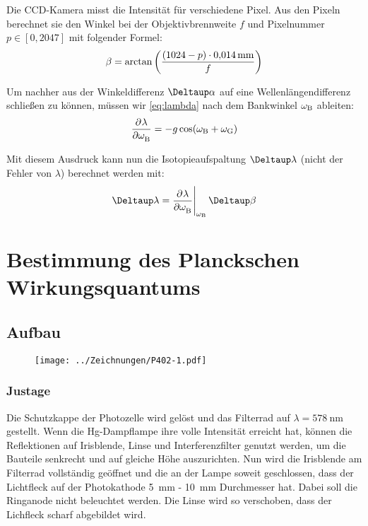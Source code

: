 Die CCD-Kamera misst die Intensität für verschiedene Pixel. Aus den Pixeln
berechnet sie den Winkel bei der Objektivbrennweite $f$ und Pixelnummer $p \in
[0, 2047]$ mit folgender Formel:
\[
    \beta = \arctan\del{\frac{(1024 - p) \cdot \SI{0.014}{\milli\meter}}f}
\]

Um nachher aus der Winkeldifferenz $\Deltaup \alpha$ auf eine
Wellenlängendifferenz schließen zu können, müssen wir \eqref{eq:lambda} nach
dem Bankwinkel $\omega_\text B$ ableiten:
\begin{equation}
    \label{eq:d_Lambda_d_beta}
    \dpd\lambda\omegaB = - g \cos(\omegaB + \omegaG)
\end{equation}

Mit diesem Ausdruck kann nun die Isotopieaufspaltung $\Deltaup \lambda$ (nicht
der Fehler von $\lambda$) berechnet werden mit:
\begin{equation}
    \label{eq:Delta_lambda}
    \Deltaup\lambda = \eval{\dpd\lambda\omegaB}_{\omegaB} \Deltaup\beta
\end{equation}


\FloatBarrier
\section{Bestimmung des Planckschen Wirkungsquantums}

\FloatBarrier
\subsection{Aufbau}

\begin{figure}[htbp]
    \centering
    \texttt{[image: ../Zeichnungen/P402-1.pdf]}
    \caption{%
        \parencite[Abbildung~P402.1]{physik412-Anleitung}
    }
    \label{fig:P402.1}
\end{figure}

\FloatBarrier
\subsubsection{Justage}

Die Schutzkappe der Photozelle wird gelöst und das Filterrad auf $\lambda =
\SI{578}{\nano\meter}$ gestellt. Wenn die Hg-Dampflampe ihre volle Intensität
erreicht hat, können die Reflektionen auf Irisblende, Linse und
Interferenzfilter genutzt werden, um die Bauteile senkrecht und auf gleiche
Höhe auszurichten. Nun wird die Irisblende am Filterrad vollständig geöffnet
und die an der Lampe soweit geschlossen, dass der Lichtfleck auf der
Photokathode \SI{5}{\milli\meter} - \SI{10}{\milli\meter} Durchmesser hat.
Dabei soll die Ringanode nicht beleuchtet werden. Die Linse wird so verschoben,
dass der Lichfleck scharf abgebildet wird.

